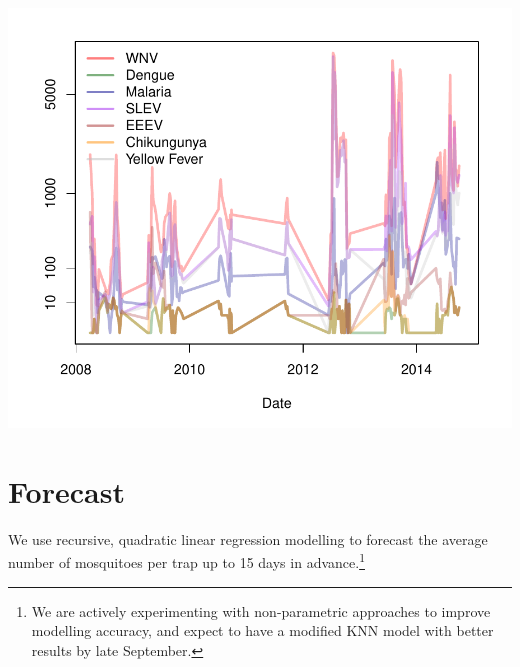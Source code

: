 \documentclass{article}
\begin{document}
\begin{multicols}{2}
\includegraphics{mosquitoReport-005}

\vfill
\newpage
\end{multicols}

\section*{Forecast}
\hrulefill
\vspace{5mm}

\noindent We use recursive, quadratic linear regression modelling to forecast the average number of mosquitoes per trap up to 15 days in advance.\footnote{We are actively experimenting with non-parametric approaches to improve modelling accuracy, and expect to have a modified KNN model with better results by late September.}  
\end{document}
